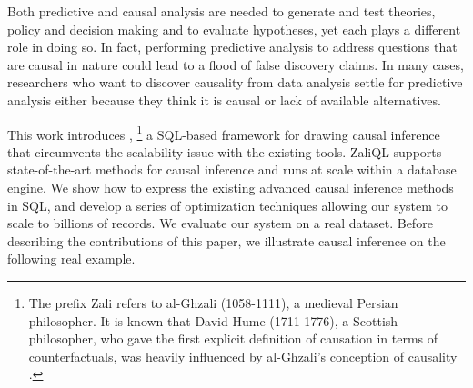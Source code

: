 Both predictive and causal analysis are needed to generate and test theories,
policy and decision making and to evaluate hypotheses, 
yet each plays a different role in doing so.
In fact, performing predictive analysis to address questions that are causal 
in nature could lead to a flood of false discovery claims.
In many cases, researchers who want to discover causality from data analysis 
settle for predictive analysis
either because they think it is causal or lack of available alternatives.

This work introduces \GSQL,
\footnote{
  The prefix Zali refers to al-Ghzali (1058-1111),
  a medieval Persian philosopher.
  It is known that David Hume (1711-1776), a Scottish philosopher,
  who gave the first explicit definition of causation in terms of counterfactuals,
  was heavily influenced by al-Ghzali's conception of causality \cite{shalizi2013advanced}.
}
a SQL-based framework for drawing causal inference 
that circumvents the scalability issue with the existing tools.
ZaliQL supports state-of-the-art methods for causal inference 
and runs at scale within a database engine.
We show how to express the existing advanced causal inference methods in SQL,
and develop a series of optimization techniques allowing our system to scale to billions of records.
We evaluate our system on a real dataset.
Before describing the contributions of this paper,
we illustrate causal inference on the following real example.

